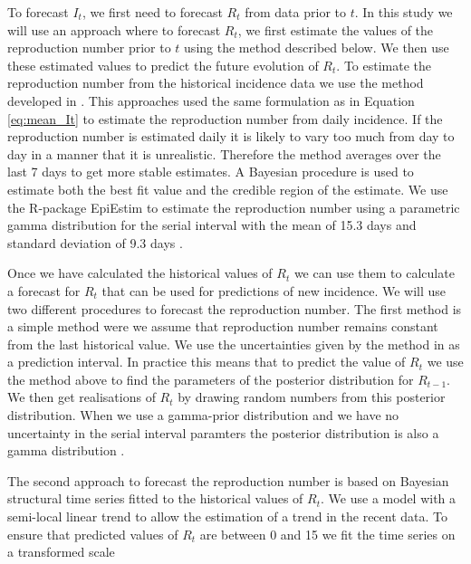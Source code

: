 \documentclass[12pt]{article}
\begin{document}

To forecast $I_t$, we first need to forecast $R_t$ from data prior to $t$. In this study we will use an approach where to forecast $R_t$, we first estimate the values of the reproduction number prior to $t$ using the method described below. We then use these estimated values to predict the future evolution of $R_t$. To estimate the reproduction number from the historical incidence data we use the method developed in \cite{coriNewFrameworkSoftware2013,thompsonImprovedInferenceTimevarying2019}. This approaches used the same formulation as in Equation \ref{eq:mean_It} to estimate the reproduction number from daily incidence. If the reproduction number is estimated daily it is likely to vary too much from day to day in a manner that it is unrealistic. Therefore the method averages over the last 7 days to get more stable estimates. A Bayesian procedure is used to estimate both the best fit value and the credible region of the estimate. We use the R-package EpiEstim \cite{coriEpiEstimEpiEstimPackage2013} to estimate the reproduction number using a parametric gamma distribution for the serial interval with the mean of 15.3 days and standard deviation of 9.3 days \cite{whoebolaresponseteamEbolaVirusDisease2014}.

Once we have calculated the historical values of $R_t$ we can use them to calculate a forecast for $R_t$ that can be used for predictions of new incidence. We will use two different procedures to forecast the reproduction number. The first method is a simple method were we assume that reproduction number remains constant from the last historical value. We use the uncertainties given by the method in \cite{coriNewFrameworkSoftware2013} as a prediction interval. In practice this means that to predict the value of $R_t$ we use the method above to find the parameters of the posterior distribution for $R_{t-1}$. We then get realisations of $R_t$ by drawing random numbers from this posterior distribution. When we use a gamma-prior distribution and we have no uncertainty in the serial interval paramters the posterior distribution is also a gamma distribution  \cite{coriNewFrameworkSoftware2013}.

The second approach to forecast the reproduction number is based on Bayesian structural time series fitted to the historical values of $R_t$. We use a model with a semi-local linear trend to allow the estimation of a trend in the recent data. To ensure that predicted values of $R_t$ are between 0 and 15 we fit the time series on a transformed scale
\end{document}
